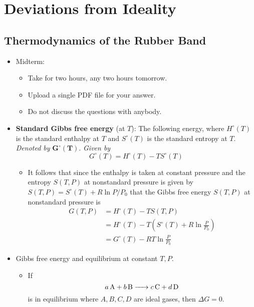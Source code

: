 \documentclass[../notes.tex]{subfiles}
\begin{document}
\chapter{Deviations from Ideality}
\section{Thermodynamics of the Rubber Band}
\begin{itemize}
    \item {}Midterm:
    \begin{itemize}
        \item Take for two hours, any two hours tomorrow.
        \item Upload a single PDF file for your answer.
        \item Do not discuss the questions with anybody.
    \end{itemize}
    \item \textbf{Standard Gibbs free energy} (at $T$): The following energy, where $H^\circ(T)$ is the standard enthalpy at $T$ and $S^\circ(T)$ is the standard entropy at $T$. \emph{Denoted by} $\bm{G^\circ(T)}$. \emph{Given by}
    \begin{equation*}
        G^\circ(T) = H^\circ(T)-TS^\circ(T)
    \end{equation*}
    \begin{itemize}
        \item It follows that since the enthalpy is taken at constant pressure and the entropy $S(T,P)$ at nonstandard pressure is given by $S(T,P)=S^\circ(T)+R\ln P/P_0$ that the Gibbs free energy $S(T,P)$ at nonstandard pressure is
        \begin{align*}
            G(T,P) &= H^\circ(T)-TS(T,P)\\
            &= H^\circ(T)-T\left( S^\circ(T)+R\ln\frac{P}{P_0} \right)\\
            &= G^\circ(T)-RT\ln\frac{P}{P_0}
        \end{align*}
    \end{itemize}
    \item Gibbs free energy and equilibrium at constant $T,P$.
    \begin{itemize}
        \item If
        \begin{equation*}
            \ce{$a$A + $b$B -> $c$C + $d$D}
        \end{equation*}
        is in equilibrium where $A,B,C,D$ are ideal gases, then $\Delta G=0$.

\end{itemize}
\end{itemize}
\end{document}
